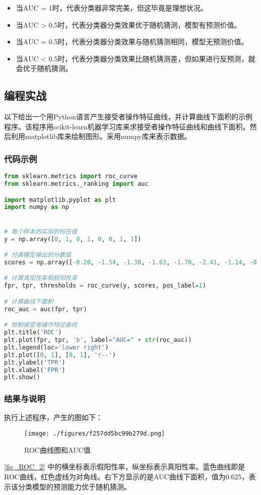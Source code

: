 \begin{itemize}
\item 当AUC = 1时，代表分类器非常完美，但这毕竟是理想状况。
\item 当AUC > 0.5时，代表分类器分类效果优于随机猜测，模型有预测价值。
\item 当AUC = 0.5时，代表分类器分类效果与随机猜测相同，模型无预测价值。
\item 当AUC < 0.5时，代表分类器分类效果比随机猜测差，但如果进行反预测，就会优于随机猜测。
\end{itemize}

\subsection{编程实战}
以下给出一个用Python语言产生接受者操作特征曲线，并计算曲线下面积的示例程序。该程序用scikit-learn机器学习库来求接受者操作特征曲线和曲线下面积。然后利用matplotlib库来绘制图形。采用numpy库来表示数据。
\subsubsection{代码示例}
\begin{lstlisting}[language=python]
from sklearn.metrics import roc_curve
from sklearn.metrics._ranking import auc

import matplotlib.pyplot as plt
import numpy as np


# 每个样本的实际的标签值
y = np.array([0, 1, 0, 1, 0, 0, 1, 1]) 

# 分类模型输出的分数值
scores = np.array([-0.20, -1.54, -1.38, -1.63, -1.70, -2.41, -1.14, -0.79])

# 计算真阳性率和假阳性率
fpr, tpr, thresholds = roc_curve(y, scores, pos_label=1)

# 计算曲线下面积
roc_auc = auc(fpr, tpr)

# 绘制接受者操作特征曲线
plt.title('ROC')
plt.plot(fpr, tpr, 'b', label="AUC=" + str(roc_auc))
plt.legend(loc='lower right')
plt.plot([0, 1], [0, 1], 'r--')
plt.ylabel('TPR')
plt.xlabel('FPR')
plt.show()
\end{lstlisting}

\subsubsection{结果与说明}
执行上述程序，产生的图如下：
\begin{figure}[ht]
\centering
\texttt{[image: ./figures/f257dd5bc99b279d.png]}
\caption{ROC曲线图和AUC值} \label{fig_ROC_2}
\end{figure}
\autoref{fig_ROC_2} 中的横坐标表示假阳性率，纵坐标表示真阳性率。蓝色曲线即是ROC曲线，红色虚线为对角线。右下方显示的是AUC曲线下面积，值为0.625，表示该分类模型的预测能力优于随机猜测。